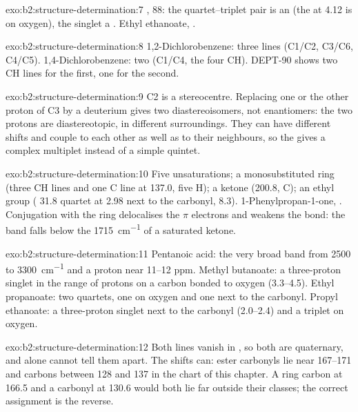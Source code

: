 \begin{solution}{exo:b2:structure-determination:7}
, 88: the quartet--triplet pair is an  (the  at 4.12 is on oxygen), the
singlet a . Ethyl ethanoate, .
\end{solution}

\begin{solution}{exo:b2:structure-determination:8}
1,2-Dichlorobenzene: three lines (C1/C2, C3/C6, C4/C5). 1,4-Dichlorobenzene: two (C1/C4, the four
CH). DEPT-90 shows two CH lines for the first, one for the second.
\end{solution}

\begin{solution}{exo:b2:structure-determination:9}
C2 is a stereocentre. Replacing one or the other proton of C3 by a deuterium gives two
diastereoisomers, not enantiomers: the two protons are diastereotopic, in different surroundings.
They can have different shifts and couple to each other as well as to their neighbours, so the
 gives a complex multiplet instead of a simple quintet.
\end{solution}

\begin{solution}{exo:b2:structure-determination:10}
Five unsaturations; a monosubstituted ring (three CH lines and one C line at 137.0, five 
H); a ketone (200.8, C); an ethyl group ( 31.8 quartet at 2.98 next to the carbonyl, 
8.3). 1-Phenylpropan-1-one, . Conjugation with the ring delocalises the 
$\pi$ electrons and weakens the bond: the band falls below the \qty{1715}{cm^{-1}} of a saturated ketone.
\end{solution}

\begin{solution}{exo:b2:structure-determination:11}
Pentanoic acid: the very broad  band from 2500 to \qty{3300}{cm^{-1}} and a proton near 11--12
ppm. Methyl butanoate: a three-proton singlet in the range of protons on a carbon bonded to oxygen
(3.3--4.5). Ethyl propanoate: two quartets, one on oxygen and one next to the carbonyl. Propyl
ethanoate: a three-proton singlet next to the carbonyl (2.0--2.4) and a triplet on oxygen.
\end{solution}

\begin{solution}{exo:b2:structure-determination:12}
Both lines vanish in , so both are quaternary, and  alone cannot tell them apart. The shifts
can: ester carbonyls lie near 167--171 and  carbons between 128 and 137 in the chart of this
chapter. A ring carbon at 166.5 and a carbonyl at 130.6 would both lie far outside their classes; the
correct assignment is the reverse.
\end{solution}

